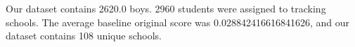 Our dataset contains 2620.0 boys.                     2960 students were assigned to tracking schools.                     The average baseline original score was 0.028842416616841626,                     and our dataset contains 108 unique schools.
